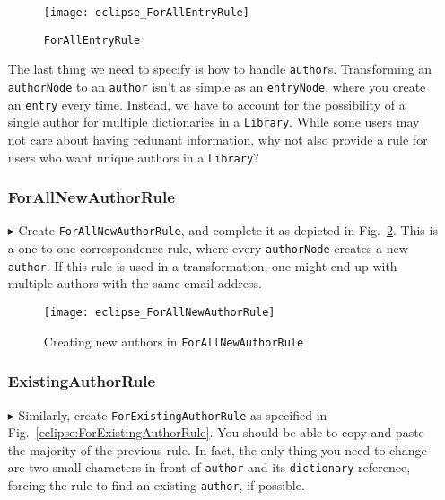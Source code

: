 \begin{itemize}
\newpage

\begin{figure}[htbp]
\begin{center}
  \texttt{[image: eclipse\_ForAllEntryRule]}
  \caption{\texttt{ForAllEntryRule}}
  \label{eclipse:ForAllEntryRule}
\end{center}
\end{figure}

\vspace{0.5cm}

The last thing we need to specify is how to handle \texttt{author}s. Transforming an \texttt{authorNode} to an \texttt{author} isn't as simple as
an \texttt{entryNode}, where you create an \texttt{entry} every time. Instead, we have to account for the possibility of a single author
for multiple dictionaries in a \texttt{Library}. While some users may not care about having redunant information, why not also provide a rule for users
who want unique authors in a \texttt{Library}?

\subsubsection{ForAllNewAuthorRule} %

\item[$\blacktriangleright$] Create \texttt{ForAllNewAuthorRule}, and complete it as depicted in Fig.~\ref{eclipse:ForAllNewAuthorRule}. This is a one-to-one
correspondence rule, where every \texttt{authorNode} creates a new \texttt{author}. If this rule is used in a transformation, one might end up with
multiple authors with the same email address.

\vspace{0.5cm}

\begin{figure}[htbp]
\begin{center}
  \texttt{[image: eclipse\_ForAllNewAuthorRule]}
  \caption{Creating new authors in \texttt{ForAllNewAuthorRule}}
  \label{eclipse:ForAllNewAuthorRule}
\end{center}
\end{figure}

\subsubsection{ExistingAuthorRule} %

\item[$\blacktriangleright$] Similarly, create \texttt{ForExistingAuthorRule} as specified in Fig.~\ref{eclipse:ForExistingAuthorRule}. You should be able to
copy and paste the majority of the previous rule. In fact, the only thing you need to change are two small characters in front of \texttt{author} and its
\texttt{dictionary} reference, forcing the rule to find an existing \texttt{author}, if possible.


\end{itemize}
